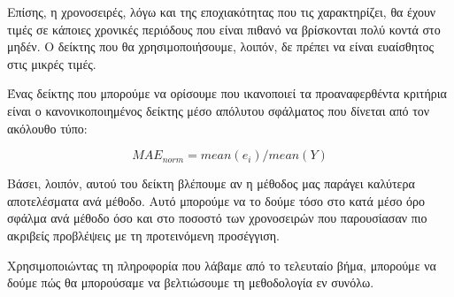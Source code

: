 Επίσης, η χρονοσειρές, λόγω και της εποχιακότητας που τις χαρακτηρίζει, θα έχουν τιμές σε κάποιες χρονικές περιόδους που είναι πιθανό να βρίσκονται πολύ κοντά στο μηδέν. Ο δείκτης που θα χρησιμοποιήσουμε, λοιπόν, δε πρέπει να είναι ευαίσθητος στις μικρές τιμές.

Ένας δείκτης που μπορούμε να ορίσουμε που ικανοποιεί τα προαναφερθέντα κριτήρια είναι ο κανονικοποιημένος δείκτης μέσο απόλυτου σφάλματος που δίνεται από τον ακόλουθο τύπο:

\[ MAE_{norm} = mean(e_i)/mean(Y) \]

Βάσει, λοιπόν, αυτού του δείκτη βλέπουμε αν η μέθοδος μας παράγει καλύτερα αποτελέσματα ανά μέθοδο. Αυτό μπορούμε να το δούμε τόσο στο κατά μέσο όρο σφάλμα ανά μέθοδο όσο και στο ποσοστό των χρονοσειρών που παρουσίασαν πιο ακριβείς προβλέψεις με τη προτεινόμενη προσέγγιση. 

Χρησιμοποιώντας τη πληροφορία που λάβαμε από το τελευταίο βήμα, μπορούμε να δούμε πώς θα μπορούσαμε να βελτιώσουμε τη μεθοδολογία εν συνόλω.


